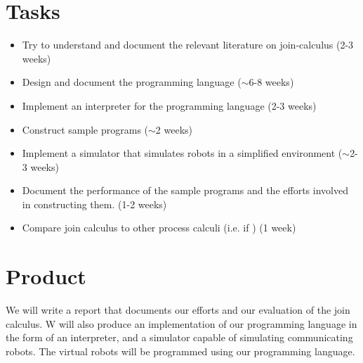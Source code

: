 \documentclass[a4paper, 11pt, oneside, report]{memoir}
\begin{document}
\section*{Tasks}

\begin{itemize}
\item
  Try to understand and document the relevant literature on
  join-calculus (2-3 weeks)

\item
  Design and document the programming language (\ensuremath{\sim}6-8
  weeks)

\item
  Implement an interpreter for the programming language (2-3 weeks)

\item
  Construct sample programs (\ensuremath{\sim}2 weeks)

\item
  Implement a simulator that simulates robots in a simplified environment
  (\ensuremath{\sim}2-3 weeks)

\item
  Document the performance of the sample programs and the efforts
  involved in constructing them. (1-2 weeks)

\item
  Compare join calculus to other process calculi (i.e. if ) (1 week)

\end{itemize}
\section*{Product}

We will write a report that documents our efforts and our evaluation of the
join calculus. W will also produce an implementation of our programming
language in the form of an interpreter, and a simulator capable of simulating
communicating robots. The virtual robots will be programmed using our
programming language.



\end{document}
